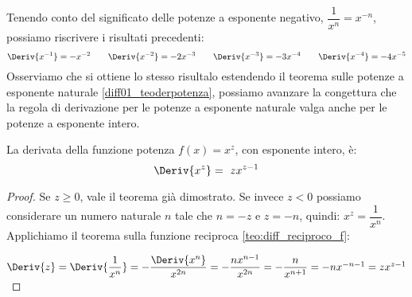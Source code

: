 Tenendo conto del significato delle potenze a esponente negativo, 
\(\dfrac{1}{x^n} = x^{-n}\), possiamo riscrivere i risultati precedenti: 
\[
\Deriv{x^{-1}} = -x^{-2} \qquad
\Deriv{x^{-2}} = -2x^{-3} \qquad
\Deriv{x^{-3}} = -3x^{-4} \qquad
\Deriv{x^{-4}} = -4x^{-5} 
\]
Osserviamo che si ottiene lo stesso risultalo estendendo il 
teorema sulle potenze a esponente naturale \ref{diff01_teoderpotenza},
possiamo avanzare la congettura che la regola di derivazione per le 
potenze a esponente naturale valga anche per le potenze a esponente 
intero.

% 
% 
% 
% 

\begin{teorema}
\label{teo:diff01_deri_x_alla_z}
La derivata della funzione potenza \(f(x)= x^z\), con esponente 
intero, è: 
\[\Deriv{x^z}=~zx^{z-1}\]
\end{teorema}
\begin{proof}
Se \(z \geqslant 0\), vale il teorema già dimostrato. 
Se invece \(z < 0\) possiamo considerare un numero naturale \(n\) 
tale che \(n = -z\) e \(z = -n\), quindi: 
\(x^z = \dfrac{1}{x^n}\).
Applichiamo il teorema sulla funzione reciproca 
\ref{teo:diff_reciproco_f}:

\hspace{13mm}
\(\Deriv{z} = 
  \Deriv{\dfrac{1}{x^n}} = -\dfrac{\Deriv{x^n}}{x^{2n}} = 
  -\dfrac{nx^{n-1}}{x^{2n}} = -\dfrac{n}{x^{n+1}} = -n{x^{-n-1}} =
  z{x^{z-1}}\)
\end{proof}

